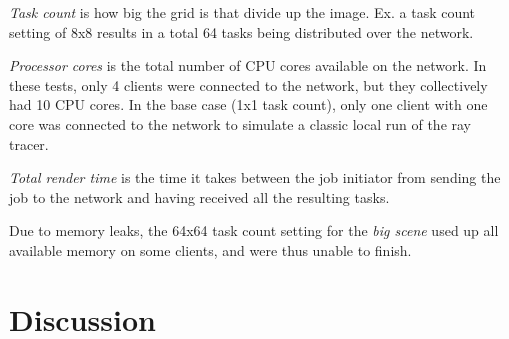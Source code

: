 \begin{center}
    \emph{Task count} is how big the grid is that divide up the image. Ex. a task count setting of 8x8 results in a total 64 tasks being distributed over the network.
    
    \emph{Processor cores} is the total number of CPU cores available on the network. In these tests, only 4 clients were connected to the network, but they collectively had 10 CPU cores. In the base case (1x1 task count), only one client with one core was connected to the network to simulate a classic local run of the ray tracer.
    
    \emph{Total render time} is the time it takes between the job initiator from sending the job to the network and having received all the resulting tasks.
\end{center}

  Due to memory leaks, the 64x64 task count setting for the \emph{big scene} used up all available memory on some clients, and were thus unable to finish.


\section{Discussion}




